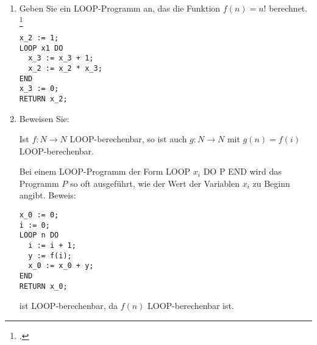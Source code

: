 \documentclass{bschlangaul-aufgabe}
\begin{document}

\begin{enumerate}

%

\item Geben Sie ein LOOP-Programm an, das die Funktion $f(n) = n!$
berechnet.
\footcite[Aufgabe 1]{theo:ab:4}

\begin{bAntwort}
\begin{verbatim}
x_2 := 1;
LOOP x1 DO
  x_3 := x_3 + 1;
  x_2 := x_2 * x_3;
END
x_3 := 0;
RETURN x_2;
\end{verbatim}
\end{bAntwort}


\item

Beweisen Sie:

Ist $f : N \rightarrow N$ LOOP-berechenbar, so ist auch
$g : N \rightarrow N$ mit $g(n) = f (i)$
LOOP-berechenbar.

\begin{bAntwort}
Bei einem LOOP-Programm der Form LOOP $x_i$ DO P END wird das Programm
$P$ so oft ausgeführt, wie der Wert der Variablen $x_i$ zu Beginn
angibt. Beweis:

\begin{verbatim}
x_0 := 0;
i := 0;
LOOP n DO
  i := i + 1;
  y := f(i);
  x_0 := x_0 + y;
END
RETURN x_0;
\end{verbatim}

ist LOOP-berechenbar, da $f(n)$ LOOP-berechenbar ist.
\end{bAntwort}

\end{enumerate}
\end{document}
